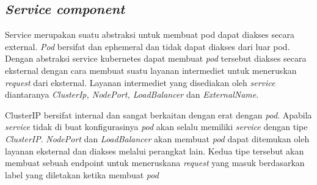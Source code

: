 \subsection{\textit{Service component}}

Service merupakan suatu abstraksi untuk membuat pod dapat diakses secara external. \textit{Pod} bersifat dan ephemeral dan tidak dapat diakses dari luar pod. Dengan abstraksi service kubernetes dapat membuat \textit{pod} tersebut diakses secara eksternal dengan cara membuat suatu layanan intermediet untuk meneruskan \textit{request} dari eksternal.
Layanan intermediet yang disediakan oleh \textit{service} diantaranya \textit{ClusterIp, NodePort, LoadBalancer} dan  \textit{ExternalName}.

ClusterIP bersifat internal dan sangat berkaitan dengan erat dengan \textit{pod}. Apabila \textit{service} tidak di buat konfigurasinya \textit{pod} akan selalu memiliki \textit{service} dengan tipe \textit{ClusterIP}. \textit{NodePort} dan \textit{LoadBalancer} akan membuat \textit{pod} dapat ditemukan oleh layanan eksternal dan diakses melalui perangkat lain. Kedua tipe tersebut akan membuat sebuah endpoint untuk meneruskana \textit{request} yang masuk berdasarkan label yang diletakan ketika membuat \textit{pod} \parencite{service}